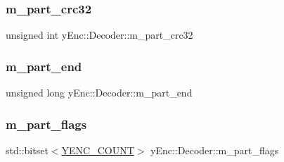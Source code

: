 \hypertarget{classy_enc_1_1_decoder_a3cbcb4f8c5ee3c60017afc02ed037a6e}{}\label{classy_enc_1_1_decoder_a3cbcb4f8c5ee3c60017afc02ed037a6e} 
\subsubsection{\texorpdfstring{m\+\_\+part\+\_\+crc32}{m\_part\_crc32}}
{\footnotesize\ttfamily unsigned int y\+Enc\+::\+Decoder\+::m\+\_\+part\+\_\+crc32\hspace{0.3cm}{\ttfamily [protected]}}

\hypertarget{classy_enc_1_1_decoder_a11de19ca153e7731a281d508adc4a7ca}{}\label{classy_enc_1_1_decoder_a11de19ca153e7731a281d508adc4a7ca} 
\subsubsection{\texorpdfstring{m\+\_\+part\+\_\+end}{m\_part\_end}}
{\footnotesize\ttfamily unsigned long y\+Enc\+::\+Decoder\+::m\+\_\+part\+\_\+end\hspace{0.3cm}{\ttfamily [protected]}}

\hypertarget{classy_enc_1_1_decoder_a12eee9d1b428b91da6a4ab79086e6073}{}\label{classy_enc_1_1_decoder_a12eee9d1b428b91da6a4ab79086e6073} 
\subsubsection{\texorpdfstring{m\+\_\+part\+\_\+flags}{m\_part\_flags}}
{\footnotesize\ttfamily std\+::bitset$<$\hyperlink{classy_enc_1_1_decoder_a15a9416c693c4a3333d0b2417decdffeae4f10b60345053ec76d279f0b1a28dcf}{Y\+E\+N\+C\+\_\+\+C\+O\+U\+NT}$>$ y\+Enc\+::\+Decoder\+::m\+\_\+part\+\_\+flags\hspace{0.3cm}{\ttfamily [protected]}}

\hypertarget{classy_enc_1_1_decoder_ad5b7ac19fa8ca63d83781afc14f96bb6}{}\label{classy_enc_1_1_decoder_ad5b7ac19fa8ca63d83781afc14f96bb6} 

